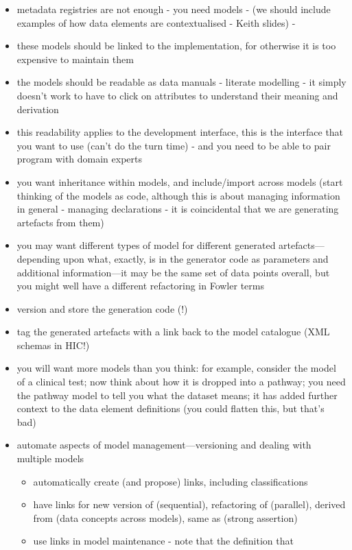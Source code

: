 \begin{itemize}
\item metadata registries are not enough - you need models - (we
  should include examples  of how data elements are contextualised -
  Keith slides) - 
\item these models should be linked to the implementation, for
  otherwise it is too expensive to maintain them
\item the models should be readable as data manuals - literate
  modelling - it simply doesn't work to have to click on attributes to
  understand their meaning and derivation 
\item this readability applies to the development interface, this is
  the interface that you want to use (can't do the turn time) - and
  you need to be able to pair program with domain experts
\item you want inheritance within models, and include/import across
  models (start thinking of the models as code, although this is about
  managing information in general - managing declarations - it is
  coincidental that we are generating artefacts from them)
\item you may want different types of model for different generated
  artefacts---depending upon what, exactly, is in the generator code
  as parameters and additional information---it may be the same set of
  data points overall, but you might well have a different refactoring
  in Fowler terms
\item version and store the generation code (!)
\item tag the generated artefacts with a link back to the model
  catalogue (XML schemas in HIC!)
\item you will want more models than you think: for example, consider
  the model of a clinical test; now think about how it is dropped into
  a pathway; you need the pathway model to tell you what the dataset
  means; it has added further context to the data element definitions
  (you could flatten this, but that's bad)
\item automate aspects of model management---versioning and dealing
  with multiple models
  \begin{itemize}
  \item automatically create (and propose) links, including
    classifications
  \item have links for new version of (sequential), refactoring of
    (parallel), derived from (data concepts across models), same as
    (strong assertion)
  \item use links in model maintenance - note that the definition that

\end{itemize}
\end{itemize}
